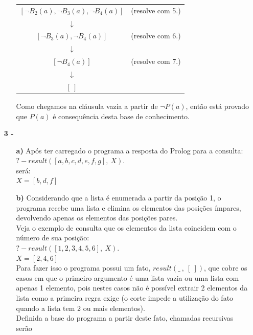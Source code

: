 \documentclass[12pt]{article}
\begin{document}
\begin{itemize}
\begin{itemize}
\begin{center}
\begin{tabular}{c c}
							$[\neg B_2(a), \neg B_3(a), \neg B_4(a)]$ & (resolve com 5.)\\
							$\downarrow$ & \\
							$[\neg B_3(a), \neg B_4(a)]$ & (resolve com 6.)\\
							$\downarrow$ & \\
							$[\neg B_4(a)]$ & (resolve com 7.)\\
							$\downarrow$ & \\
							$[ \ ]$ & \\
						\end{tabular}
					\end{center}
					\hfill\newline
					Como chegamos na cláusula vazia a partir de $\neg P(a)$, então está provado 
					que $P(a)$ é consequência desta base de conhecimento.
			\end{itemize}
		\item[\textbf{3 -}]
			\hfill\newline
			\begin{itemize}
				\item[\textbf{a) }]
					\hfill\newline
					Após ter carregado o programa a resposta do Prolog para a consulta:\\
					$?- result([a , b , c , d , e , f , g], \ X ).$\\
					será:\\
					$X = [b, d, f]$
				\item[\textbf{b) }]
					\hfill\newline
					Considerando que a lista é enumerada a partir da posição 1, o programa recebe
					uma lista e elimina os elementos das posições ímpares, devolvendo apenas
					os elementos das posições pares.\\
					Veja o exemplo de consulta que os elementos da lista coincidem com o número 
					de sua posição:\\
					$?- result([1, 2, 3, 4, 5, 6], \ X ).$\\
					$X = [2, 4, 6]$\\
					Para fazer isso o programa possui um fato, $result(\_ \ , \ [ \ ])$, que cobre os
					casos em que o primeiro argumento é uma lista vazia ou uma lista com apenas
					1 elemento, pois nestes casos não é possível extrair 2 elementos da lista
					como a primeira regra exige (o corte impede a utilização do fato quando
					a lista tem 2 ou mais elementos).\\
					Definida a base do programa a partir deste fato, chamadas recursivas serão

\end{itemize}
\end{itemize}
\end{document}
